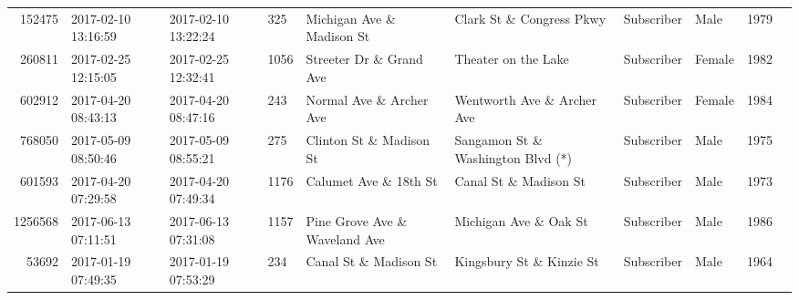 \documentclass[11pt]{article}
\begin{document}
\begin{description}
\begin{tabular}{r|lllllllll}
	  152475                             & 2017-02-10 13:16:59                 & 2017-02-10 13:22:24                 &  325                                & Michigan Ave \& Madison St         & Clark St \& Congress Pkwy          & Subscriber                          & Male                                & 1979                               \\
	  260811                           & 2017-02-25 12:15:05               & 2017-02-25 12:32:41               & 1056                              & Streeter Dr \& Grand Ave         & Theater on the Lake               & Subscriber                        & Female                            & 1982                             \\
	  602912                             & 2017-04-20 08:43:13                 & 2017-04-20 08:47:16                 &  243                                & Normal Ave \& Archer Ave           & Wentworth Ave \& Archer Ave        & Subscriber                          & Female                              & 1984                               \\
	  768050                             & 2017-05-09 08:50:46                 & 2017-05-09 08:55:21                 &  275                                & Clinton St \& Madison St           & Sangamon St \& Washington Blvd (*) & Subscriber                          & Male                                & 1975                               \\
	  601593                             & 2017-04-20 07:29:58                 & 2017-04-20 07:49:34                 & 1176                                & Calumet Ave \& 18th St             & Canal St \& Madison St             & Subscriber                          & Male                                & 1973                               \\
	 1256568                             & 2017-06-13 07:11:51                 & 2017-06-13 07:31:08                 & 1157                                & Pine Grove Ave \& Waveland Ave     & Michigan Ave \& Oak St             & Subscriber                          & Male                                & 1986                               \\
	   53692                             & 2017-01-19 07:49:35                 & 2017-01-19 07:53:29                 &  234                                & Canal St \& Madison St             & Kingsbury St \& Kinzie St          & Subscriber                          & Male                                & 1964                               \\

\end{tabular}
\end{description}
\end{document}
